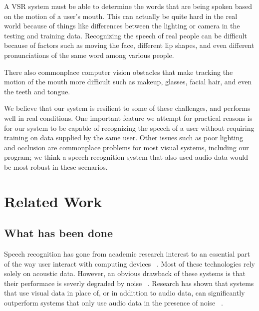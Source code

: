 \documentclass[10pt,twocolumn,letterpaper]{article}
\begin{document}
A VSR system must be able to determine the words that are being spoken based on the motion of a user's mouth. This can actually be quite hard in the real world because of things like differences between the lighting or camera in the testing and training data. Recognizing the speech of real people can be difficult because of factors such as moving the face, different lip shapes, and even different pronunciations of the same word among various people.

There also commonplace computer vision obstacles that make tracking the motion of the mouth more difficult such as makeup, glasses, facial hair, and even the teeth and tongue.

We believe that our system is resilient to some of these challenges, and performs well in real conditions. One important feature we attempt for practical reasons is for our system to be capable of recognizing the speech of a user without requiring training on data supplied by the same user. Other issues such as poor lighting and occlusion are commonplace problems for most visual systems, including our program; we think a speech recognition system that also used audio data would be most robust in these scenarios.



\section{Related Work}
\subsection{What has been done}
Speech recognition has gone from academic research interest to an essential part of the way user interact with computing devices ~\cite{Lison:2014:SDS:2677339.2659891}.
Most of these technologies rely solely on acoustic data. However, an obvious drawback of these systems is that their performace is severly degraded by noise ~\cite{Cooke2001267}. Research has shown that systems that use visual data in place of, or in addittion to audio data, can significantly outperform systems that only use audio data in the presence of noise ~\cite{Lison:2014:SDS:2677339.2659891}.
\end{document}
